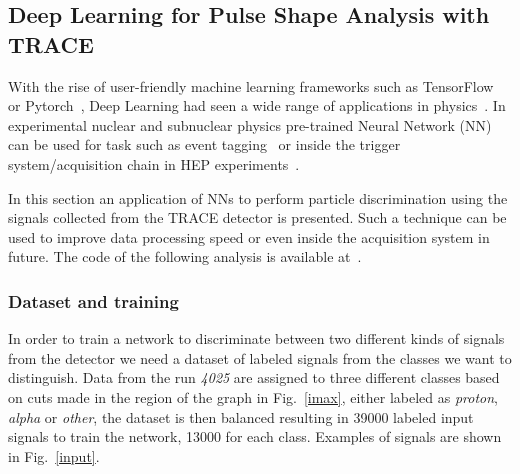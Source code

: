 \subsection{Deep Learning for Pulse Shape Analysis with TRACE} \label{deep}
With the rise of user-friendly machine learning frameworks such as TensorFlow~\cite{tensorflow} or Pytorch~\cite{pytorch}, Deep Learning had seen a wide range of applications in physics~\cite{ml4phys}. In experimental nuclear and subnuclear physics pre-trained Neural Network (NN) can be used for task such as event tagging~\cite{baldi} or inside the trigger system/acquisition chain in HEP experiments~\cite{williams}. 


In this section an application of NNs to perform particle discrimination using the signals collected from the TRACE detector is presented. Such a technique can be used to improve data processing speed or even inside the acquisition system in future.
The code of the following analysis is available at~\cite{github-nn}.

\subsubsection{Dataset and training}

In order to train a network to discriminate between two different kinds of signals from the detector we need a dataset of labeled signals from the classes we want to distinguish. Data from the run \emph{4025} are assigned to three different classes based on cuts made in the region of the graph in Fig.~\ref{imax}, either labeled as \emph{proton}, \emph{alpha} or \emph{other}, the dataset is then balanced resulting in \num{39000} labeled input signals to train the network, \num{13000} for each class. Examples of signals are shown in Fig.~\ref{input}.

